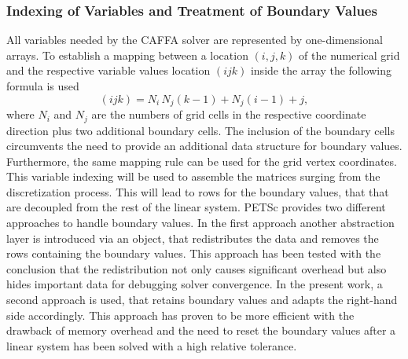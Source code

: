 \subsubsection{Indexing of Variables and Treatment of Boundary Values}

All variables needed by the CAFFA solver are represented by one-dimensional arrays. To establish a mapping between a location \((i,j,k)\) of the numerical grid and the respective variable values location \((ijk)\) inside the array the following formula is used
\begin{displaymath}
  (ijk) = N_i \, N_j \left(k - 1\right) + N_j \left(i - 1\right) + j,
\end{displaymath}
where \(N_i\) and \(N_j\) are the numbers of grid cells in the respective coordinate direction plus two additional boundary cells. The inclusion of the boundary cells circumvents the need to provide an additional data structure for boundary values. Furthermore, the same mapping rule can be used for the grid vertex coordinates. This variable indexing will be used to assemble the matrices surging from the discretization process. This will lead to rows for the boundary values, that that are decoupled from the rest of the linear system. PETSc provides two different approaches to handle boundary values. In the first approach another abstraction layer is introduced via an object, that redistributes the data and removes the rows containing the boundary values. This approach has been tested with the conclusion that the redistribution not only causes significant overhead but also hides important data for debugging solver convergence. In the present work, a second approach is used, that retains boundary values and adapts the right-hand side accordingly. This approach has proven to be more efficient with the drawback of memory overhead and the need to reset the boundary values after a linear system has been solved with a high relative tolerance.

